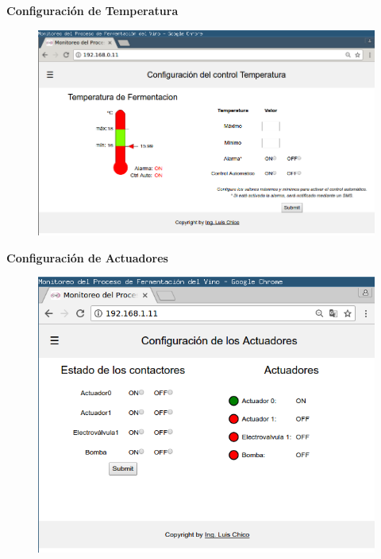 \documentclass[11pt]{beamer}
\begin{document}
\begin{frame}{\textbf{\LARGE{Configuración de Temperatura}}}
  \vspace{-.7cm}
  \begin{figure}[H]
    {\includegraphics[width=1\textwidth]{./imagenes/config_temp.png}}
  \end{figure}	
\end{frame}

\begin{frame}{\textbf{\LARGE{Configuración de Actuadores}}}
  \vspace{-.7cm}
  \begin{figure}[H]
    {\includegraphics[width=1\textwidth]{./imagenes/config_act.png}}
  \end{figure}	
\end{frame}
\end{document}
